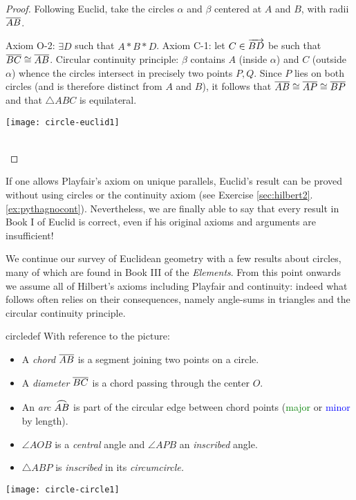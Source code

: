 \begin{proof}
Following Euclid, take the circles $\alpha$ and $\beta$ centered at $A$ and $B$, with radii $\overline{AB}$.\par
\begin{minipage}[t]{0.58\linewidth}\vspace{-5pt}
Axiom O-2: $\exists D$ such that $A*B*D$.\smallbreak
Axiom C-1: let $C\in\overrightarrow{BD}$ be such that $\overline{BC}\cong\overline{AB}$.\smallbreak
Circular continuity principle: $\beta$ contains $A$ (inside $\alpha$) and $C$ (outside $\alpha$) whence the circles intersect in precisely two points $P,Q$.\smallbreak
Since $P$ lies on both circles (and is therefore distinct from $A$ and $B$), it follows that $\overline{AB}\cong\overline{AP}\cong\overline{BP}$ and that $\triangle ABC$ is equilateral.
\end{minipage}\hfill\begin{minipage}[t]{0.41\linewidth}\vspace{-5pt}
\flushright \texttt{[image: circle-euclid1]}
\end{minipage}\\[-5pt]
\end{proof}

If one allows Playfair's axiom on unique parallels, Euclid's result can be proved without using circles or the continuity axiom (see Exercise \ref*{sec:hilbert2}.\ref{ex:pythagnocont}). Nevertheless, we are finally able to say that every result in Book I of Euclid is correct, even if his original axioms and arguments are insufficient!




We continue our survey of Euclidean geometry with a few results about circles, many of which are found in Book III of the \emph{Elements}. From this point onwards we assume all of Hilbert's axioms including Playfair and continuity: indeed what follows often relies on their consequences, namely angle-sums in triangles and the circular continuity principle.

\begin{defn}[lower separated=false, sidebyside, sidebyside align=top seam, sidebyside gap=0pt, righthand width=0.35\linewidth]{}{circledef}
With reference to the picture:
\begin{itemize}
  \item A \emph{chord} $\overline{AB}$ is a segment joining two points on a circle.
  \item A \emph{diameter} $\overline{BC}$ is a chord passing through the center $O$.
  \item An \emph{arc} $\arc{AB}$ is part of the circular edge between chord points (\textcolor{Green}{major} or \textcolor{blue}{minor} by length).
  \item $\angle AOB$ is a \emph{central} angle and $\angle APB$ an \emph{inscribed} angle.
  \item $\triangle ABP$ is \emph{inscribed} in its \emph{circumcircle.}
\end{itemize}
\tcblower
\flushright\texttt{[image: circle-circle1]}
\end{defn}

